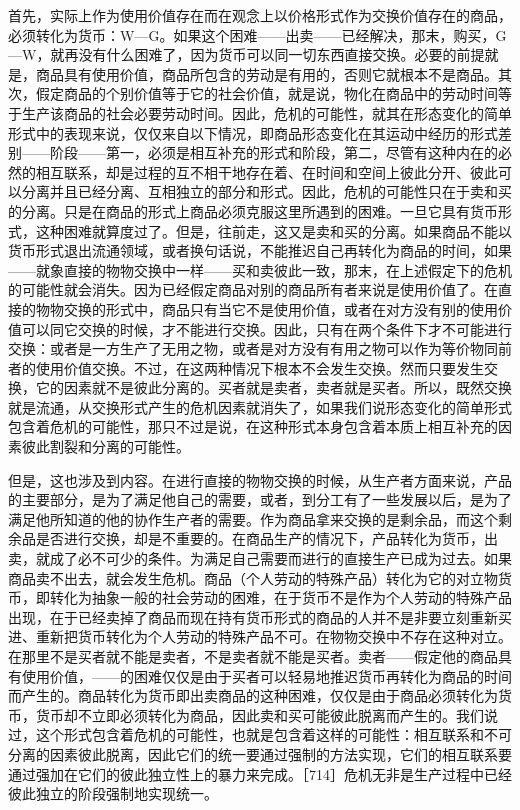 首先，实际上作为使用价值存在而在观念上以价格形式作为交换价值存在的商品，必须转化为货币：W—G。如果这个困难——出卖——已经解决，那末，购买，G—W，就再没有什么困难了，因为货币可以同一切东西直接交换。必要的前提就是，商品具有使用价值，商品所包含的劳动是有用的，否则它就根本不是商品。其次，假定商品的个别价值等于它的社会价值，就是说，物化在商品中的劳动时间等于生产该商品的社会必要劳动时间。因此，危机的可能性，就其在形态变化的简单形式中的表现来说，仅仅来自以下情况，即商品形态变化在其运动中经历的形式差别——阶段——第一，必须是相互补充的形式和阶段，第二，尽管有这种内在的必然的相互联系，却是过程的互不相干地存在着、在时间和空间上彼此分开、彼此可以分离并且已经分离、互相独立的部分和形式。因此，危机的可能性只在于卖和买的分离。只是在商品的形式上商品必须克服这里所遇到的困难。一旦它具有货币形式，这种困难就算度过了。但是，往前走，这又是卖和买的分离。如果商品不能以货币形式退出流通领域，或者换句话说，不能推迟自己再转化为商品的时间，如果——就象直接的物物交换中一样——买和卖彼此一致，那末，在上述假定下的危机的可能性就会消失。因为已经假定商品对别的商品所有者来说是使用价值了。在直接的物物交换的形式中，商品只有当它不是使用价值，或者在对方没有别的使用价值可以同它交换的时候，才不能进行交换。因此，只有在两个条件下才不可能进行交换：或者是一方生产了无用之物，或者是对方没有有用之物可以作为等价物同前者的使用价值交换。不过，在这两种情况下根本不会发生交换。然而只要发生交换，它的因素就不是彼此分离的。买者就是卖者，卖者就是买者。所以，既然交换就是流通，从交换形式产生的危机因素就消失了，如果我们说形态变化的简单形式包含着危机的可能性，那只不过是说，在这种形式本身包含着本质上相互补充的因素彼此割裂和分离的可能性。

但是，这也涉及到内容。在进行直接的物物交换的时候，从生产者方面来说，产品的主要部分，是为了满足他自己的需要，或者，到分工有了一些发展以后，是为了满足他所知道的他的协作生产者的需要。作为商品拿来交换的是剩余品，而这个剩余品是否进行交换，却是不重要的。在商品生产的情况下，产品转化为货币，出卖，就成了必不可少的条件。为满足自己需要而进行的直接生产已成为过去。如果商品卖不出去，就会发生危机。商品（个人劳动的特殊产品）转化为它的对立物货币，即转化为抽象一般的社会劳动的困难，在于货币不是作为个人劳动的特殊产品出现，在于已经卖掉了商品而现在持有货币形式的商品的人并不是非要立刻重新买进、重新把货币转化为个人劳动的特殊产品不可。在物物交换中不存在这种对立。在那里不是买者就不能是卖者，不是卖者就不能是买者。卖者——假定他的商品具有使用价值，——的困难仅仅是由于买者可以轻易地推迟货币再转化为商品的时间而产生的。商品转化为货币即出卖商品的这种困难，仅仅是由于商品必须转化为货币，货币却不立即必须转化为商品，因此卖和买可能彼此脱离而产生的。我们说过，这个形式包含着危机的可能性，也就是包含着这样的可能性：相互联系和不可分离的因素彼此脱离，因此它们的统一要通过强制的方法实现，它们的相互联系要通过强加在它们的彼此独立性上的暴力来完成。［714］危机无非是生产过程中已经彼此独立的阶段强制地实现统一。

